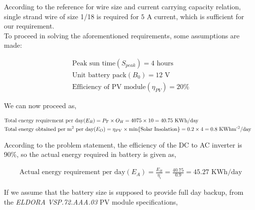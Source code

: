 \documentclass{home_assignment}
\begin{document}
        According to the reference for wire size and current carrying capacity relation, single strand wire of size 1/18 is required for $5$ A current, which is sufficient for our requirement.
        \\
        To proceed in solving the aforementioned requirements, some assumptions are made:
        \begin{fleqn}[\parindent]
            \begin{equation*}
               \begin{split}
                &\text{Peak sun time} (S_{peak})= 4 \text{ hours}\\
                &\text{Unit battery pack} (B_0)= 12 \text{ V}\\
                &\text{Efficiency of PV module} (\eta_{PV})=20\%
                 \end{split}
               \end{equation*}
            \end{fleqn}
            We can now proceed as,
    \begin{fleqn}[\parindent]
                \begin{equation*}
                   \begin{split}
                    &\text{Total energy requirement per day} (E_R)= P_T\times O_H= 4075\times10= 40.75\text{ KWh/day}\\
                    &\text{Total energy obtained per m\textsuperscript{2} per day} (E_O)=\eta_{PV}\times \text{min\{Solar Insolation\}}=0.2\times4=0.8 \text{ KWhm\textsuperscript{-2}/day} 
                     \end{split}
                   \end{equation*}
    \end{fleqn}
    According to the problem statement, the efficiency of the DC to AC inverter is 90\%, so the actual energy required in battery is given as,
    \begin{fleqn}[\parindent]
        \begin{equation*}
           \begin{split}
            &\text{Actual energy requirement per day} (E_A)= \frac{E_R}{\eta_i}= \frac{40.75}{0.9}=45.27 \text{ KWh/day}
             \end{split}
           \end{equation*}
\end{fleqn}
If we assume that the battery size is supposed to provide full day backup, from the \textit{ELDORA VSP.72.AAA.03} PV module specifications,
\end{document}
